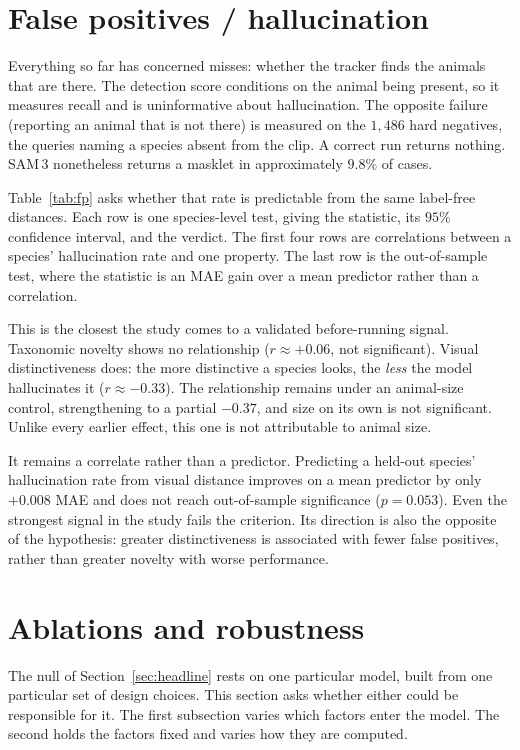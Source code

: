 
\section{False positives / hallucination}
\label{sec:fp}
Everything so far has concerned misses: whether the tracker finds the animals that are there. The detection
score conditions on the animal being present, so it measures recall and is uninformative about hallucination.
The opposite failure (reporting an animal that is not there) is measured on the $1{,}486$ hard negatives, the
queries naming a species absent from the clip. A correct run returns nothing. SAM\,3 nonetheless returns a
masklet in approximately $9.8\%$ of cases.

Table~\ref{tab:fp} asks whether that rate is predictable from the same label-free distances. Each row is one
species-level test, giving the statistic, its $95\%$ confidence interval, and the verdict. The first four rows
are correlations between a species' hallucination rate and one property. The last row is the out-of-sample
test, where the statistic is an MAE gain over a mean predictor rather than a correlation.

This is the closest the study comes to a validated before-running signal. Taxonomic novelty shows no
relationship ($r\approx+0.06$, not significant). Visual distinctiveness does: the more distinctive a species
looks, the \emph{less} the model hallucinates it ($r\approx-0.33$). The relationship remains under an
animal-size control, strengthening to a partial $-0.37$, and size on its own is not significant. Unlike every
earlier effect, this one is not attributable to animal size.

It remains a correlate rather than a predictor. Predicting a held-out species' hallucination rate from visual
distance improves on a mean predictor by only $+0.008$ MAE and does not reach out-of-sample significance
($p=0.053$). Even the strongest signal in the study fails the criterion. Its direction is also the opposite of
the hypothesis: greater distinctiveness is associated with fewer false positives, rather than greater novelty
with worse performance.


\section{Ablations and robustness}
\label{sec:robustness}
The null of Section~\ref{sec:headline} rests on one particular model, built from one particular set of design
choices. This section asks whether either could be responsible for it. The first subsection varies which
factors enter the model. The second holds the factors fixed and varies how they are computed.


